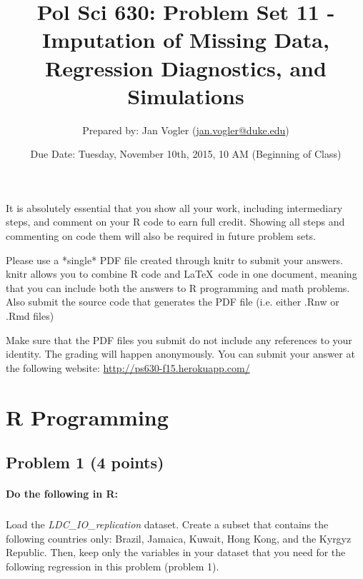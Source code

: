 \documentclass[12pt]{article}
\begin{document}
\title{Pol Sci 630: Problem Set 11 - Imputation of Missing Data, Regression Diagnostics, and Simulations}

\author{Prepared by: Jan Vogler (\href{mailto:jan.vogler@duke.edu}{jan.vogler@duke.edu})}

\date{Due Date: Tuesday, November 10th, 2015, 10 AM (Beginning of Class)}
 
\maketitle 



It is absolutely essential that you show all your work, including intermediary steps, and comment on your R code to earn full credit. Showing all steps and commenting on code them will also be required in future problem sets.

Please use a *single* PDF file created through knitr to submit your answers. knitr allows you to combine R code and \LaTeX \ code in one document, meaning that you can include both the answers to R programming and math problems. Also submit the source code that generates the PDF file (i.e. either .Rnw or .Rmd files)

Make sure that the PDF files you submit do not include any references to your identity. The grading will happen anonymously. You can submit your answer at the following website: \url{http://ps630-f15.herokuapp.com/}



\section*{R Programming}

\subsection*{Problem 1 (4 points)}

\paragraph{Do the following in R:}

\subparagraph{} Load the \textit{LDC\_IO\_replication} dataset. Create a subset that contains the following countries only: Brazil, Jamaica, Kuwait, Hong Kong, and the Kyrgyz Republic. Then, keep only the variables in your dataset that you need for the following regression in this problem (problem 1).
\end{document}
